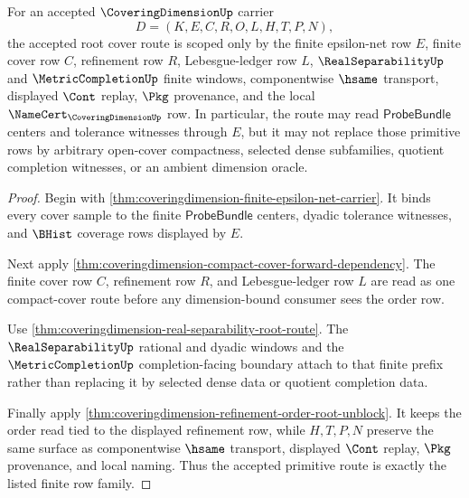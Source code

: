 \begin{theorem}
\label{thm:coveringdimension-root-cover-scope-primitive-route}
For an accepted $\CoveringDimensionUp$ carrier
$$
D=(K,E,C,R,O,L,H,T,P,N),
$$
the accepted root cover route is scoped only by the finite epsilon-net row
$E$, finite cover row $C$, refinement row $R$, Lebesgue-ledger row $L$,
$\RealSeparabilityUp$ and $\MetricCompletionUp$ finite windows,
componentwise $\hsame$ transport, displayed $\Cont$ replay, $\Pkg$
provenance, and the local $\NameCert_{\CoveringDimensionUp}$ row. In
particular, the route may read $\mathsf{ProbeBundle}$ centers and tolerance
witnesses through $E$, but it may not replace those primitive rows by
arbitrary open-cover compactness, selected dense subfamilies, quotient
completion witnesses, or an ambient dimension oracle.
\end{theorem}
\begin{proof}
Begin with \autoref{thm:coveringdimension-finite-epsilon-net-carrier}. It
binds every cover sample to the finite $\mathsf{ProbeBundle}$ centers,
dyadic tolerance witnesses, and $\BHist$ coverage rows displayed by $E$.

Next apply \autoref{thm:coveringdimension-compact-cover-forward-dependency}.
The finite cover row $C$, refinement row $R$, and Lebesgue-ledger row $L$
are read as one compact-cover route before any dimension-bound consumer sees
the order row.

Use \autoref{thm:coveringdimension-real-separability-root-route}. The
$\RealSeparabilityUp$ rational and dyadic windows and the
$\MetricCompletionUp$ completion-facing boundary attach to that finite
prefix rather than replacing it by selected dense data or quotient
completion data.

Finally apply \autoref{thm:coveringdimension-refinement-order-root-unblock}.
It keeps the order read tied to the displayed refinement row, while
$H,T,P,N$ preserve the same surface as componentwise $\hsame$ transport,
displayed $\Cont$ replay, $\Pkg$ provenance, and local naming. Thus the
accepted primitive route is exactly the listed finite row family.
\end{proof}

